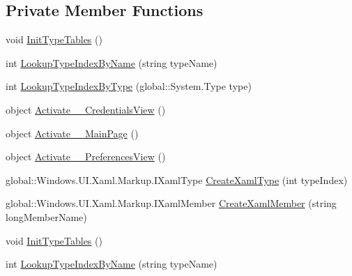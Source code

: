 \subsection*{Private Member Functions}
\begin{DoxyCompactItemize}
\item 
void \hyperlink{class_eli_log_in_app_1_1_eli_log_in_app___xaml_type_info_1_1_xaml_type_info_provider_ae3ee5a8073d4b5fd053001fc6278bf63}{Init\+Type\+Tables} ()
\item 
int \hyperlink{class_eli_log_in_app_1_1_eli_log_in_app___xaml_type_info_1_1_xaml_type_info_provider_a26e953f4fb4614e058021c6ba196921b}{Lookup\+Type\+Index\+By\+Name} (string type\+Name)
\item 
int \hyperlink{class_eli_log_in_app_1_1_eli_log_in_app___xaml_type_info_1_1_xaml_type_info_provider_a453cf311d0a1c227eff7bfcfb266cf2f}{Lookup\+Type\+Index\+By\+Type} (global\+::\+System.\+Type type)
\item 
object \hyperlink{class_eli_log_in_app_1_1_eli_log_in_app___xaml_type_info_1_1_xaml_type_info_provider_a01e6bb3a6b174fc011375cf553a6f095}{Activate\+\_\+\_\+\+Credentials\+View} ()
\item 
object \hyperlink{class_eli_log_in_app_1_1_eli_log_in_app___xaml_type_info_1_1_xaml_type_info_provider_ad5797ff4475aaa7ef01f104191782a0f}{Activate\+\_\+\_\+\+Main\+Page} ()
\item 
object \hyperlink{class_eli_log_in_app_1_1_eli_log_in_app___xaml_type_info_1_1_xaml_type_info_provider_a9d824bf7047ee59b79e8d12eac141273}{Activate\+\_\+\_\+\+Preferences\+View} ()
\item 
global\+::\+Windows.\+U\+I.\+Xaml.\+Markup.\+I\+Xaml\+Type \hyperlink{class_eli_log_in_app_1_1_eli_log_in_app___xaml_type_info_1_1_xaml_type_info_provider_ab81d867444ab14bd51b63aba4089901b}{Create\+Xaml\+Type} (int type\+Index)
\item 
global\+::\+Windows.\+U\+I.\+Xaml.\+Markup.\+I\+Xaml\+Member \hyperlink{class_eli_log_in_app_1_1_eli_log_in_app___xaml_type_info_1_1_xaml_type_info_provider_a8e9162d3ca590994cc68dcf8f94ffad2}{Create\+Xaml\+Member} (string long\+Member\+Name)
\item 
void \hyperlink{class_eli_log_in_app_1_1_eli_log_in_app___xaml_type_info_1_1_xaml_type_info_provider_ae3ee5a8073d4b5fd053001fc6278bf63}{Init\+Type\+Tables} ()
\item 
int \hyperlink{class_eli_log_in_app_1_1_eli_log_in_app___xaml_type_info_1_1_xaml_type_info_provider_a26e953f4fb4614e058021c6ba196921b}{Lookup\+Type\+Index\+By\+Name} (string type\+Name)

\end{DoxyCompactItemize}

